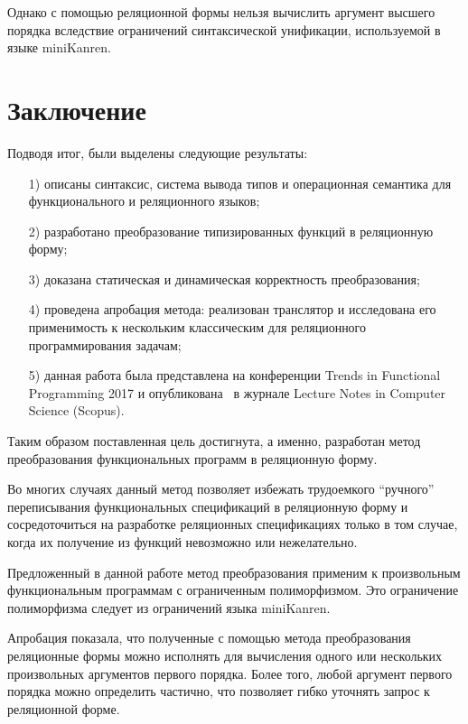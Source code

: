 Однако с помощью реляционной формы нельзя вычислить аргумент высшего порядка вследствие ограничений синтаксической унификации, используемой в языке miniKanren.

\section{Заключение}

Подводя итог, были выделены следующие результаты:
\begin{enumerate}
\item[1)] описаны синтаксис, система вывода типов и операционная семантика для функционального и реляционного языков;
\item[2)] разработано преобразование типизированных функций в реляционную форму;
\item[3)] доказана статическая и динамическая корректность преобразования;
\item[4)] проведена апробация метода: реализован транслятор и исследована его применимость к нескольким классическим для реляционного программирования задачам;
\item[5)] данная работа была представлена на конференции Trends in \linebreak Functional Programming 2017 и опубликована~\cite{RelConvTFP} в журнале Lecture Notes in Computer Science (Scopus).
\end{enumerate}

Таким образом поставленная цель достигнута, а именно, разработан метод преобразования функциональных программ в реляционную форму.

Во многих случаях данный
метод позволяет избежать трудоемкого ``ручного'' переписывания
функциональных спецификаций в реляционную форму и сосредоточиться на разработке
реляционных спецификациях только в том случае, когда их получение из функций
невозможно или нежелательно.

Предложенный в данной работе метод преобразования применим к произвольным функциональным программам
с ограниченным полиморфизмом. Это ограничение полиморфизма следует из ограничений языка miniKanren.

Апробация показала, что полученные с помощью метода преобразования
реляционные формы можно исполнять для вычисления одного или нескольких произвольных
аргументов первого порядка. Более того, любой аргумент первого порядка
можно определить частично, что позволяет гибко уточнять запрос к реляционной форме.

